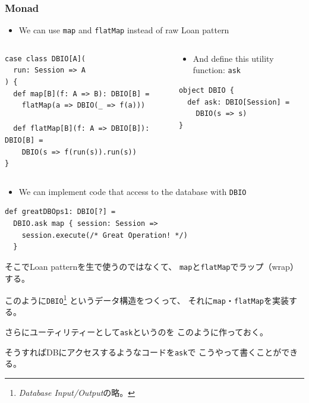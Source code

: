 \begin{frame}[fragile]
  \frametitle{Monad}

  \pause
  \begin{itemize}
    \item We can use \lstinline|map| and \lstinline|flatMap|
    instead of raw Loan pattern
  \end{itemize}

  \begin{columns}
    \pause
    \begin{column}{0.55\textwidth}
\begin{lstlisting}[style=scala]
case class DBIO[A](
  run: Session => A 
) {
  def map[B](f: A => B): DBIO[B] =
    flatMap(a => DBIO(_ => f(a)))

  def flatMap[B](f: A => DBIO[B]): DBIO[B] =
    DBIO(s => f(run(s)).run(s))
}
\end{lstlisting}
    \end{column}
    \pause
    \begin{column}{0.45\textwidth}
      \begin{itemize}
        \item And define this utility function: \lstinline|ask|
      \end{itemize}

\begin{lstlisting}[style=scala]
object DBIO {
  def ask: DBIO[Session] =
    DBIO(s => s)
}
\end{lstlisting}
    \end{column}
  \end{columns}

  \pause
  \begin{itemize}
    \item We can implement code that access to the database
    with \lstinline|DBIO|
  \end{itemize}

\begin{lstlisting}[style=scala]
def greatDBOps1: DBIO[?] =
  DBIO.ask map { session: Session =>
    session.execute(/* Great Operation! */)
  }
\end{lstlisting}

  \begin{notes}
    \item そこでLoan patternを生で使うのではなくて、
    \lstinline|map|と\lstinline|flatMap|でラップ（wrap）する。

    \item このように\lstinline|DBIO|\footnote{\emph{Database Input/Output}の略。}%
    というデータ構造をつくって、
    それに\lstinline|map|・\lstinline|flatMap|を実装する。

    \item さらにユーティリティーとして\lstinline|ask|というのを
    このように作っておく。

    \item そうすればDBにアクセスするようなコードを\lstinline|ask|で
    こうやって書くことができる。
  \end{notes}
\end{frame}

